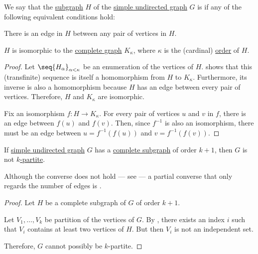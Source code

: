 \begin{definition}\label{def:complete_subgraph}\mimprovised
  We say that the \hyperref[def:undirected_graph/subgraph]{subgraph} \( H \) of the \hyperref[def:undirected_graph]{simple undirected graph} \( G \) is  if any of the following equivalent conditions hold:
  \begin{thmenum}
     There is an edge in \( H \) between any pair of vertices in \( H \).

     \( H \) is isomorphic to the \hyperref[def:complete_graph]{complete graph} \( K_\kappa \), where \( \kappa \) is the (cardinal) \hyperref[def:graph_cardinality/order]{order} of \( H \).
  \end{thmenum}
\end{definition}
\begin{proof}
   Let \( \seq{ H_\alpha }_{\alpha < \kappa} \) be an enumeration of the vertices of \( H \).  shows that this (transfinite) sequence is itself a homomorphism from \( H \) to \( K_\kappa \). Furthermore, its inverse is also a homomorphism because \( H \) has an edge between every pair of vertices. Therefore, \( H \) and \( K_\kappa \) are isomorphic.

   Fix an isomorphism \( f: H \to K_\kappa \). For every pair of vertices \( u \) and \( v \) in \( f \), there is an edge between \( f(u) \) and \( f(v) \). Then, since \( f^{-1} \) is also an isomorphism, there must be an edge between \( u = f^{-1}(f(u)) \) and \( v = f^{-1}(f(v)) \).
\end{proof}

\begin{proposition}\label{thm:multipartite_graph_complete_subgraph}
  If \hyperref[def:undirected_graph]{simple undirected graph} \( G \) has a \hyperref[def:complete_subgraph]{complete subgraph} of order \( k+1 \), then \( G \) is not \hyperref[def:multipartite_graph]{\( k \)-partite}.
\end{proposition}
\begin{comments}
  \item Although the converse does not hold --- see  --- a partial converse that only regards the number of edges is .
\end{comments}
\begin{proof}
  Let \( H \) be a complete subgraph of \( G \) of order \( k + 1 \).

  Let \( V_1, \ldots, V_k \) be  partition of the vertices of \( G \). By , there exists an index \( i \) such that \( V_i \) contains at least two vertices of \( H \). But then \( V_i \) is not an independent set.

  Therefore, \( G \) cannot possibly be \( k \)-partite.
\end{proof}

